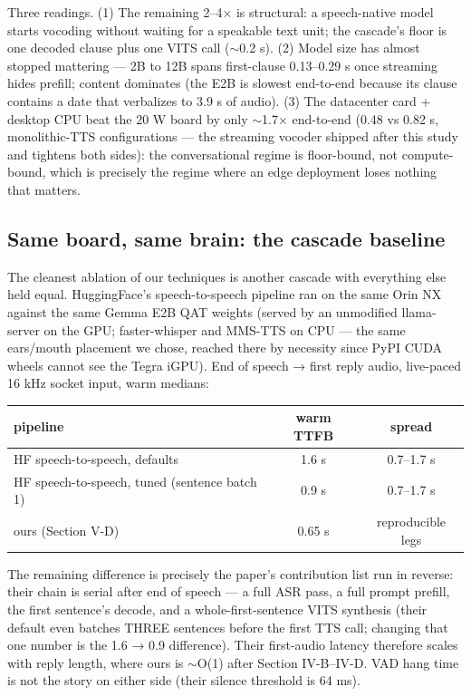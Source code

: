 \documentclass[journal]{IEEEtran}
\begin{document}
Three readings. (1) The remaining 2–4× is structural: a speech-native model starts vocoding without waiting for a speakable text unit; the cascade's floor is one decoded clause plus one VITS call ($\sim$0.2 s). (2) Model size has almost stopped mattering — 2B to 12B spans first-clause 0.13–0.29 s once streaming hides prefill; content dominates (the E2B is slowest end-to-end because its clause contains a date that verbalizes to 3.9 s of audio). (3) The datacenter card + desktop CPU beat the 20 W board by only $\sim$1.7× end-to-end (0.48 vs 0.82 s, monolithic-TTS configurations — the streaming vocoder shipped after this study and tightens both sides): the conversational regime is floor-bound, not compute-bound, which is precisely the regime where an edge deployment loses nothing that matters.

\subsection{Same board, same brain: the cascade baseline}
The cleanest ablation of our techniques is another cascade with everything else held equal. HuggingFace's speech-to-speech pipeline ran on the same Orin NX against the same Gemma E2B QAT weights (served by an unmodified llama-server on the GPU; faster-whisper and MMS-TTS on CPU — the same ears/mouth placement we chose, reached there by necessity since PyPI CUDA wheels cannot see the Tegra iGPU). End of speech → first reply audio, live-paced 16 kHz socket input, warm medians:


\begin{table}[H]
\centering
\begin{tabular}{>{\raggedright\arraybackslash}p{2cm}cc}
\hline
pipeline & warm TTFB & spread \\
\hline
HF speech-to-speech, defaults & 1.6 s & 0.7--1.7 s \\
HF speech-to-speech, tuned (sentence batch 1) & 0.9 s & 0.7--1.7 s \\
ours (Section V-D) & 0.65 s & reproducible legs \\
\hline
\end{tabular}
\end{table}

The remaining difference is precisely the paper's contribution list run in reverse: their chain is serial after end of speech — a full ASR pass, a full prompt prefill, the first sentence's decode, and a whole-first-sentence VITS synthesis (their default even batches THREE sentences before the first TTS call; changing that one number is the 1.6 → 0.9 difference). Their first-audio latency therefore scales with reply length, where ours is $\sim$O(1) after Section IV-B–IV-D. VAD hang time is not the story on either side (their silence threshold is 64 ms).
\end{document}
